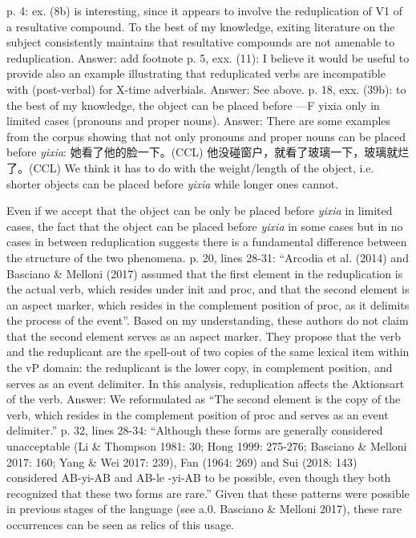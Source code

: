 \documentclass[fleqn,twoside]{article}
\begin{document}
{p. 4: ex. (8b) is interesting, since it appears to involve the reduplication of V1 of a resultative compound. To the best of my knowledge, exiting literature on the subject consistently maintains that resultative compounds are not amenable to reduplication.
Answer: add footnote
p. 5, exx. (11): I believe it would be useful to provide also an example illustrating that reduplicated verbs are incompatible with (post-verbal) for X-time adverbials.
Answer: See above.
p. 18, exx. (39b): to the best of my knowledge, the object can be placed before —F yixia only in limited cases (pronouns and proper nouns).
Answer: 
There are some examples from the corpus showing that not only pronouns and proper nouns can be placed before \textit{yixia}:
她看了他的脸一下。(CCL)
他没碰窗户，就看了玻璃一下，玻璃就烂了。(CCL)
We think it has to do with the weight/length of the object, i.e. shorter objects can be placed before \textit{yixia} while longer ones cannot.

Even if we accept that the object can be only be placed before \textit{yixia} in limited cases, 
the fact that the object can be placed before \textit{yixia} in some cases but in no cases in between reduplication suggests there is a fundamental difference between the structure of the two phenomena.
p. 20, lines 28-31: “Arcodia et al. (2014) and Basciano \& Melloni (2017) assumed that the first
element in the reduplication is the actual verb, which resides under init and proc, and that the
second element is an aspect marker, which resides in the complement position of proc, as it delimits
the process of the event”. Based on my understanding, these authors do not claim that the second
element serves as an aspect marker. They propose that the verb and the reduplicant are the spell-out
of two copies of the same lexical item within the vP domain: the reduplicant is the lower copy, in
complement position, and serves as an event delimiter. In this analysis, reduplication affects the Aktionsart of the verb.
Answer: We reformulated as ``The second element is the copy of the verb, which resides in the complement position of proc and serves as an event delimiter.''
p. 32, lines 28-34: “Although these forms are generally considered unacceptable (Li \& Thompson 1981: 30; Hong 1999: 275-276; Basciano \& Melloni 2017: 160; Yang \& Wei 2017: 239), Fan (1964: 269) and Sui (2018: 143) considered AB-yi-AB and AB-le -yi-AB to be possible, even though they both recognized that these two forms are rare.” Given that these patterns were possible in previous stages of the language (see a.0. Basciano \& Melloni 2017), these rare occurrences can be seen as relics of this usage. 

}
\end{document}
